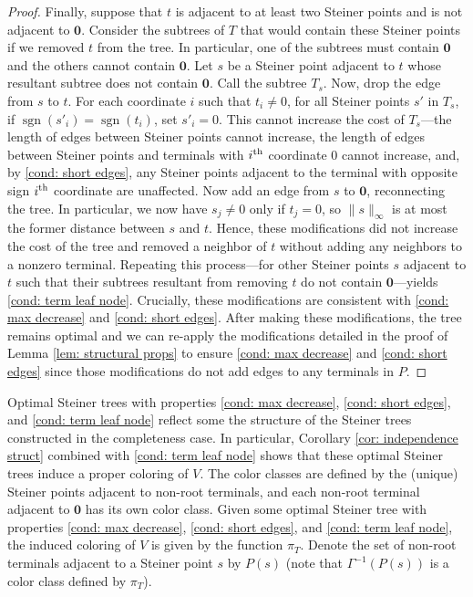 \documentclass{article}\providecommand{\DeclareRedundantLanguages}[2]{}\usepackage[a4paper,margin=20mm]{geometry}
\DeclareMathOperator{\sgn}{sgn}
\newcommand{\1}{\textbf{1}}
\begin{document}
\begin{proof}
Finally, suppose that $t$ is adjacent to at least two Steiner points and is not adjacent to $\mathbf{0}$. Consider the subtrees of $T$ that would contain these Steiner points if we removed $t$ from the tree. In particular, one of the subtrees must contain $\mathbf{0}$ and the others cannot contain $\mathbf{0}$. Let $s$ be a Steiner point adjacent to $t$ whose resultant subtree does not contain $\mathbf{0}$. Call the subtree $T_s$. Now, drop the edge from $s$ to $t$. For each coordinate $i$ such that $t_i \neq 0$, for all Steiner points $s'$ in $T_s$, if $\sgn(s'_i) = \sgn(t_i)$, set $s'_i = 0$. This cannot increase the cost of $T_s$—the length of edges between Steiner points cannot increase, the length of edges between Steiner points and terminals with $i\textsuperscript{th} $ coordinate $0$ cannot increase, and, by \ref{cond: short edges}, any Steiner points adjacent to the terminal with opposite sign $i\textsuperscript{th} $ coordinate are unaffected.  Now add an edge  from $s$ to $\mathbf{0}$, reconnecting the tree. In particular, we now have $s_j \neq 0$ only if $t_j = 0$, so $\|s \|_{\infty}$ is at most the former distance between $s$ and $t$. Hence, these modifications did not increase the cost of the tree and removed a neighbor of $t$ without adding any neighbors to a nonzero terminal. Repeating this process—for other Steiner points $s$ adjacent to $t$ such that their subtrees resultant from removing $t$ do not contain $\mathbf{0}$—yields \ref{cond: term leaf node}. Crucially, these modifications are consistent with \ref{cond: max decrease} and \ref{cond: short edges}. After making these modifications, the tree remains optimal and we can re-apply the modifications detailed in the proof of Lemma \ref{lem: structural props} to ensure  \ref{cond: max decrease} and \ref{cond: short edges} since those modifications do not add edges to any terminals in $P$.
\end{proof}

Optimal Steiner trees with properties 
\ref{cond: max decrease}, \ref{cond: short edges}, and \ref{cond: term leaf node} reflect some the structure of the Steiner trees constructed in the completeness case. In particular, Corollary \ref{cor: independence struct} combined with \ref{cond: term leaf node} shows that these optimal Steiner trees induce a proper coloring of $V$. The color classes are defined by the (unique) Steiner points adjacent to non-root terminals, and each non-root terminal adjacent to $\mathbf{0}$ has its own color class. Given some optimal Steiner tree with properties \ref{cond: max decrease}, \ref{cond: short edges}, and \ref{cond: term leaf node}, the induced coloring of $V$ is given by the function $\pi_T$. Denote the set of non-root terminals adjacent to a Steiner point $s$ by $P(s)$ (note that $\Gamma^{-1}(P(s))$ is a color class defined by $\pi_T$).
\end{document}
